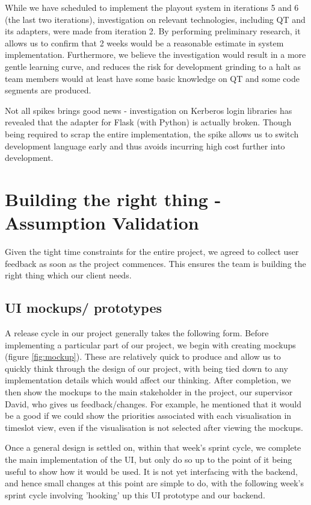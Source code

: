 \documentclass[a4paper]{article}
\begin{document}
While we have scheduled to implement the playout system in iterations 5 and 6
(the last two iterations),
investigation on relevant technologies, including QT and its adapters, were
made from iteration 2. By performing preliminary research, it allows 
us to confirm that 2 weeks would be a reasonable estimate in system 
implementation. Furthermore, we believe the investigation would result 
in a more gentle learning curve, and reduces the risk for development 
grinding to a halt as team members would
at least have some basic knowledge on QT and some code segments are produced.

Not all spikes brings good news - investigation on Kerberos login libraries has
revealed that the adapter for Flask (with Python) is actually broken.
Though being required to scrap the entire implementation, the spike allows us
to switch development language early and thus avoids incurring high 
cost further into development.


\section{Building the right thing - Assumption Validation} \label{sec:validation}
Given the tight time constraints for the entire project, we agreed to collect
user feedback as soon as the project commences. This ensures the team
is building the right thing which our client needs.

\subsection{UI mockups/ prototypes} \label{sec:uimockup}
A release cycle in our project generally takes the following form. Before
implementing a particular part of our project, we begin with creating
mockups (figure \ref{fig:mockup}). These are relatively quick to produce
and allow us to quickly think through the design of our project,
with being tied down to any implementation details which would affect
our thinking. After completion, we then show the mockups to the main
stakeholder in the project, our supervisor David, who gives us
feedback/changes. For example, he mentioned that it would be a good if we could 
show the priorities associated with each visualisation in timeslot view, 
even if the visualisation is not selected after viewing the mockups.


Once a general design is settled on, within that week's
sprint cycle, we complete the main implementation of the UI, but only do 
so up to the point of it being useful to show how it would be used. It is
not yet interfacing with the backend, and hence small changes at this 
point are simple to do, with the following week's sprint cycle involving
'hooking' up this UI prototype and our backend.
\end{document}
